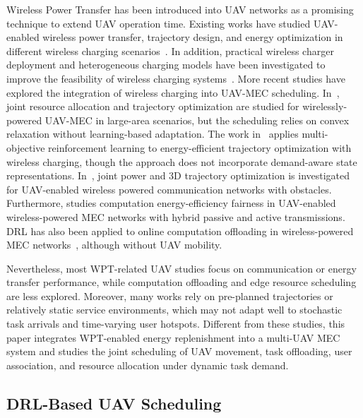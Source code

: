 \documentclass[journal]{IEEEtran}
\begin{document}
Wireless Power Transfer has been introduced into UAV 
networks as a promising technique to extend UAV operation time. 
Existing works have studied UAV-enabled wireless power transfer, 
trajectory design, and energy optimization in different wireless 
charging scenarios~\cite{xu2018uav, griffin2012resonant, 
hu2019optimal}. In addition, practical wireless charger 
deployment and heterogeneous charging models have been 
investigated to improve the feasibility of wireless charging 
systems~\cite{wang2020practical}. 
More recent studies have explored the integration of wireless 
charging into UAV-MEC scheduling. 
In~\cite{zeng2023joint}, joint resource allocation and 
trajectory optimization are studied for wirelessly-powered 
UAV-MEC in large-area scenarios, but the scheduling relies on 
convex relaxation without learning-based adaptation. 
The work in~\cite{song2024energy} applies multi-objective 
reinforcement learning to energy-efficient trajectory 
optimization with wireless charging, though the approach does 
not incorporate demand-aware state representations. 
In~\cite{pan2023joint}, joint power and 3D trajectory 
optimization is investigated for UAV-enabled wireless powered 
communication networks with obstacles. 
Furthermore, \cite{fu2024computation} studies computation 
energy-efficiency fairness in UAV-enabled wireless-powered MEC 
networks with hybrid passive and active transmissions.
DRL has also been applied to online computation offloading in wireless-powered
MEC networks~\cite{huang2020drl_wpmec}, although without UAV mobility.


Nevertheless, most WPT-related UAV studies focus on 
communication or energy transfer performance, while computation 
offloading and edge resource scheduling are less explored. 
Moreover, many works rely on pre-planned trajectories or 
relatively static service environments, which may not adapt 
well to stochastic task arrivals and time-varying user hotspots. 
Different from these studies, this paper integrates WPT-enabled 
energy replenishment into a multi-UAV MEC system and studies 
the joint scheduling of UAV movement, task offloading, user 
association, and resource allocation under dynamic task demand.
\subsection{DRL-Based UAV Scheduling}
\end{document}
